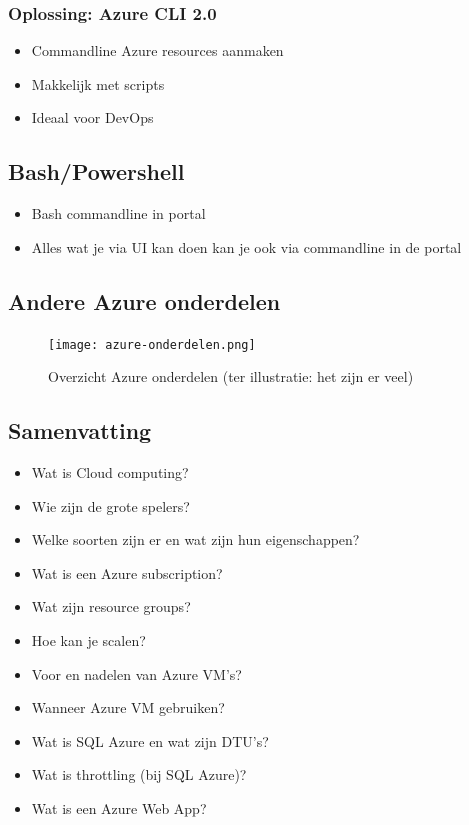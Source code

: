 \documentclass{article}
\begin{document}
\subsubsection{Oplossing: Azure CLI 2.0}
\begin{itemize}
    \item Commandline Azure resources aanmaken
    \item Makkelijk met scripts
    \item Ideaal voor DevOps
\end{itemize}

\subsection{Bash/Powershell}

\begin{itemize}
    \item Bash commandline in portal
    \item Alles wat je via UI kan doen kan je ook via commandline in de portal
\end{itemize}

\subsection{Andere Azure onderdelen}
\begin{figure}[H]
    \centering
    \texttt{[image: azure-onderdelen.png]}
    \caption{Overzicht Azure onderdelen (ter illustratie: het zijn er veel)}
\end{figure}

\subsection{Samenvatting}
\begin{itemize}
    \item Wat is Cloud computing?
    \item Wie zijn de grote spelers?
    \item Welke soorten zijn er en wat zijn hun eigenschappen?
    \item Wat is een Azure subscription?
    \item Wat zijn resource groups?
    \item Hoe kan je scalen?
    \item Voor en nadelen van Azure VM’s?
    \item Wanneer Azure VM gebruiken?
    \item Wat is SQL Azure en wat zijn DTU’s?
    \item Wat is throttling (bij SQL Azure)?
    \item Wat is een Azure Web App?
\end{itemize}
\end{document}

